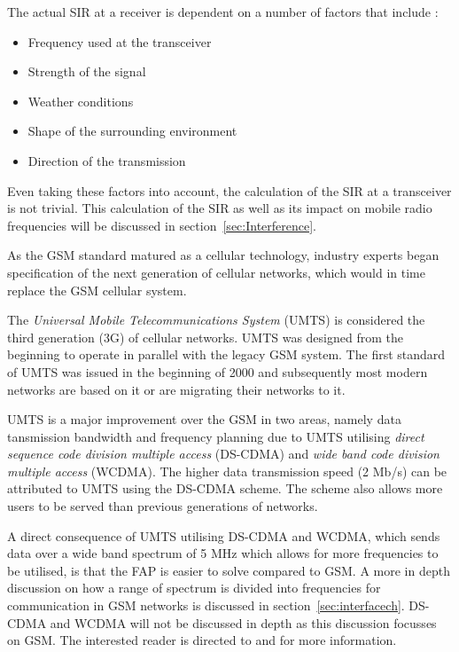 The actual SIR at a receiver is dependent on a number of factors that include \cite{GSMArchitectureProtocolsServices,Karen2004}:
\begin{itemize}
\item Frequency used at the transceiver
\item Strength of the signal
\item Weather conditions
\item Shape of the surrounding environment
\item Direction of the transmission
\end{itemize}
Even taking these factors into account, the calculation of the SIR at a transceiver is not trivial. This calculation of the SIR as well as its impact on mobile radio frequencies will be discussed in section~\ref{sec:Interference}.

As the GSM standard matured as a cellular technology, industry experts began specification of the next generation of cellular networks, which would in time replace the GSM cellular system. 

The \emph{Universal Mobile Telecommunications System} (UMTS) is considered the third generation (3G) of cellular networks. UMTS was designed from the beginning to operate in parallel with the legacy GSM system. The first standard of UMTS was issued in the beginning of 2000 and subsequently most modern networks are based on it or are migrating their networks to it.

UMTS is a major improvement over the GSM in two areas, namely data tansmission bandwidth and frequency planning due to UMTS utilising \emph{direct sequence code division multiple access} (DS-CDMA) and \emph{wide band code division multiple access} (WCDMA)\cite{tabuglobalplanning3g,Eisenblatter}. The higher data transmission speed (2 Mb/s) can be attributed to UMTS using the DS-CDMA scheme\cite{tabuglobalplanning3g,Eisenblatter}. The scheme also allows more users to be served than previous generations of networks\cite{tabuglobalplanning3g,Eisenblatter}. 

A direct consequence of UMTS utilising DS-CDMA and WCDMA, which sends data over a wide band spectrum of 5 MHz which allows for more frequencies to be utilised, is that the FAP is easier to solve compared to GSM\cite{tabuglobalplanning3g,Eisenblatter}. A more in depth discussion on how a range of spectrum is divided into frequencies for communication in GSM networks is discussed in section~\ref{sec:interfacech}. DS-CDMA and WCDMA will not be discussed in depth as this discussion focusses on GSM. The interested reader is directed to \cite{tabuglobalplanning3g} and \cite{wirelesstelcoMullet} for more information.

